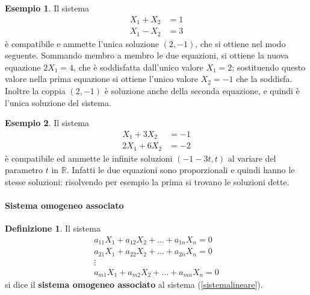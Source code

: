\documentclass{article}
\theoremstyle{plain}
\theoremstyle{definition}
\newtheorem{defn}{Definizione}[section]
\newtheorem{exmp}{Esempio}[section]
\theoremstyle{remark}
\begin{document}
\vspace{10pt}

\begin{exmp}
    Il sistema
    \[
        \begin{aligned}
            X_1 + X_2 &= 1 \\
            X_1 - X_2 &= 3
        \end{aligned}
    \]
    è compatibile e ammette l'unica soluzione \( (2, -1) \), che si ottiene nel modo seguente.
    Sommando membro a membro le due equazioni, si ottiene la nuova equazione \( 2X_1 = 4 \), che è soddisfatta dall'unico valore \( X_1 = 2 \); sostituendo questo valore nella prima equazione si ottiene l'unico valore \( X_2 = -1 \) che la soddisfa. Inoltre la coppia \( (2, -1) \) è soluzione anche della seconda equazione, e quindi è l'unica soluzione del sistema.
\end{exmp}

\vspace{10pt}

\begin{exmp}
    Il sistema
    \[
        \begin{aligned}
            X_1 + 3X_2 &= -1 \\
            2X_1 + 6X_2 &= -2
        \end{aligned}
    \]
    è compatibile ed ammette le infinite soluzioni \( (-1 - 3t, t) \) al variare del parametro \( t \) in \( \mathbb{R} \). Infatti le due equazioni sono proporzionali e quindi hanno le stesse soluzioni: risolvendo per esempio la prima si trovano le soluzioni dette.
\end{exmp}

\vspace{10pt}

\paragraph{Sistema omogeneo associato}
\begin{bxthm}
\begin{defn}
    Il sistema
    \begin{equation}
        \begin{matrix}
            a_{11}X_1 + a_{12}X_2 + \ldots + a_{1n}X_n = 0 \\
            a_{21}X_1 + a_{22}X_2 + \ldots + a_{2n}X_n = 0 \\
            \vdots \\
            a_{m1}X_1 + a_{m2}X_2 + \ldots + a_{mn}X_n = 0
        \end{matrix}\label{sistemalineareomogeneoassociato}
    \end{equation}
    si dice il \textbf{sistema omogeneo associato} al sistema (\ref{sistemalineare}).
\end{defn}
\end{bxthm}
\end{document}
